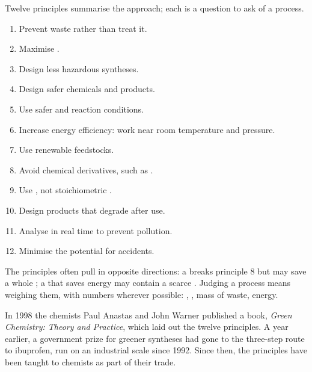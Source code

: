 Twelve principles summarise the approach; each is a question to ask of a
process.
\begin{enumerate}
  \item Prevent waste rather than treat it.
  \item Maximise .
  \item Design less hazardous syntheses.
  \item Design safer chemicals and products.
  \item Use safer  and reaction conditions.
  \item Increase energy efficiency: work near room temperature and
        pressure.
  \item Use renewable feedstocks.
  \item Avoid chemical derivatives, such as .
  \item Use , not stoichiometric .
  \item Design products that degrade after use.
  \item Analyse in real time to prevent pollution.
  \item Minimise the potential for accidents.
\end{enumerate}

\begin{remark}\label{rem:g12:synthesis-strategy:principles}
The principles often pull in opposite directions: a 
breaks principle 8 but may save a whole ; a  that saves
energy may contain a scarce . Judging a process means weighing them,
with numbers wherever possible: , , mass of waste,
energy.
\end{remark}

\begin{history}
In 1998 the chemists Paul Anastas and John Warner published a book,
\emph{Green Chemistry: Theory and Practice}, which laid out the twelve
principles. A year earlier, a government prize for greener syntheses had
gone to the three-step route to ibuprofen, run on an industrial scale
since 1992. Since then, the principles have been taught to chemists as
part of their trade.
\end{history}

